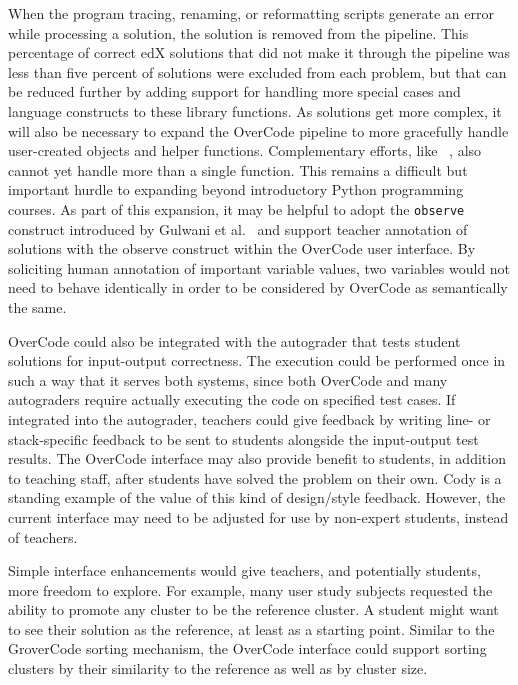 When the program tracing, renaming, or reformatting scripts generate an error while processing a solution, the solution is removed from the pipeline. This percentage of correct edX solutions that did not make it through the pipeline was less than five percent of solutions were excluded from each problem, but that can be reduced further by adding support for handling more special cases and language constructs to these library functions. As solutions get more complex, it will also be necessary to expand the OverCode pipeline to more gracefully handle user-created objects and helper functions. Complementary efforts, like ~\cite{choudhury2016autostyle}, also cannot yet handle more than a single function. This remains a difficult but important hurdle to expanding beyond introductory Python programming courses. As part of this expansion, it may be helpful to adopt the \texttt{observe} construct introduced by Gulwani et al.~\cite{gulwani_fse14} and support teacher annotation of solutions with the observe construct within the OverCode user interface. By soliciting human annotation of important variable values, two variables would not need to behave identically in order to be considered by OverCode as semantically the same.%

OverCode could also be integrated with the autograder that tests student solutions for input-output correctness. The execution could be performed once in such a way that it serves both systems, since both OverCode and many autograders require actually executing the code on specified test cases. If integrated into the autograder, teachers could give feedback by writing line- or stack-specific feedback to be sent to students alongside the input-output test results. The OverCode interface may also provide benefit to students, in addition to teaching staff, after students have solved the problem on their own. Cody is a standing example of the value of this kind of design/style feedback. However, the current interface may need to be adjusted for use by non-expert students, instead of teachers. %

Simple interface enhancements would give teachers, and potentially students, more freedom to explore. For example, many user study subjects requested the ability to promote any cluster to be the reference cluster. A student might want to see their solution as the reference, at least as a starting point. Similar to the GroverCode sorting mechanism, the OverCode interface could support sorting clusters by their similarity to the reference as well as by cluster size. 

